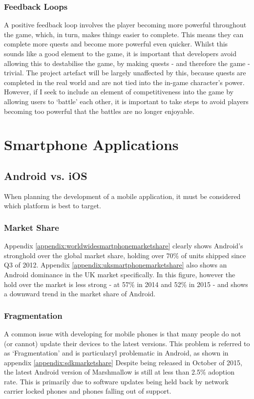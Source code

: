 \subsubsection{Feedback Loops}
A positive feedback loop involves the player becoming more powerful throughout the game, which, in turn, makes things easier to complete. This means they can complete more quests and become more powerful even quicker.
Whilst this sounds like a good element to the game, it is important that developers avoid allowing this to destabilise the game, by making quests - and therefore the game - trivial.
The project artefact will be largely unaffected by this, because quests are completed in the real world and are not tied into the in-game character's power. 
However, if I seek to include an element of competitiveness into the game by allowing users to `battle' each other, it is important to take steps to avoid players becoming too powerful that the battles are no longer enjoyable.

\section{Smartphone Applications}
\subsection{Android vs. iOS}
When planning the development of a mobile application, it must be considered which platform is best to target. 

\subsubsection{Market Share}
Appendix \ref{appendix:worldwidesmartphonemarketshare} clearly shows Android's stronghold over the global market share, holding over 70\% of units shipped since Q3 of 2012. 
Appendix \ref{appendix:uksmartphonemarketshare} also shows an Android dominance in the UK market specifically. In this figure, however the hold over the market is less strong - at 57\% in 2014 and 52\% in 2015 - and shows a downward trend in the market share of Android.

\subsubsection{Fragmentation}
A common issue with developing for mobile phones is that many people do not (or cannot) update their devices to the latest versions.
This problem is referred to as `Fragmentation' and is particularyl problematic in Android, as shown in appendix \ref{appendix:sdkmarketshare}
Despite being released in October of 2015, the latest Android version of Marshmallow is still at less than 2.5\% adoption rate. 
This is primarily due to software updates being held back by network carrier locked phones and phones falling out of support.

